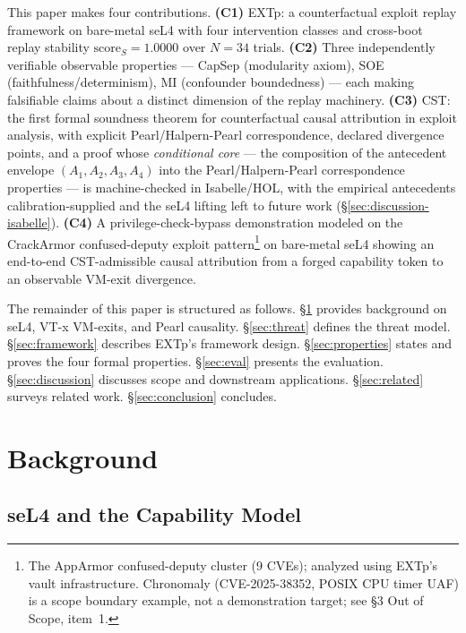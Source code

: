 \documentclass[conference]{IEEEtran}
\newcommand{\scoreS}{\text{score}_S}
\begin{document}
This paper makes four contributions.
\textbf{(C1)} EXTp: a counterfactual exploit replay framework on
bare-metal seL4 with four intervention classes and cross-boot replay
stability $\scoreS = 1.0000$ over $N{=}34$ trials.
\textbf{(C2)} Three independently verifiable observable properties
--- CapSep (modularity axiom), SOE (faithfulness/determinism), MI
(confounder boundedness) --- each making falsifiable claims about a
distinct dimension of the replay machinery.
\textbf{(C3)} CST: the first formal soundness theorem for
counterfactual causal attribution in exploit analysis, with explicit
Pearl/Halpern-Pearl correspondence, declared divergence points, and a
proof whose \emph{conditional core} --- the composition of the
antecedent envelope $(A_1, A_2, A_3, A_4)$ into the Pearl/Halpern-Pearl
correspondence properties --- is machine-checked in Isabelle/HOL, with
the empirical antecedents calibration-supplied and the seL4 lifting
left to future work (\S\ref{sec:discussion-isabelle}).
\textbf{(C4)} A privilege-check-bypass demonstration modeled on the
CrackArmor confused-deputy exploit pattern\footnote{The AppArmor
confused-deputy cluster (9 CVEs); analyzed using EXTp's vault
infrastructure. Chronomaly (CVE-2025-38352, POSIX CPU timer UAF) is
a scope boundary example, not a demonstration target; see \S3 Out of
Scope, item~1.} on bare-metal seL4 showing an end-to-end
CST-admissible causal attribution from a forged capability token to
an observable VM-exit divergence.

The remainder of this paper is structured as follows. \S\ref{sec:background}
provides background on seL4, VT-x VM-exits, and Pearl causality.
\S\ref{sec:threat} defines the threat model. \S\ref{sec:framework}
describes EXTp's framework design. \S\ref{sec:properties} states and
proves the four formal properties. \S\ref{sec:eval} presents the
evaluation. \S\ref{sec:discussion} discusses scope and downstream
applications. \S\ref{sec:related} surveys related work.
\S\ref{sec:conclusion} concludes.

\section{Background}\label{sec:background}

\subsection{seL4 and the Capability Model}
\end{document}
